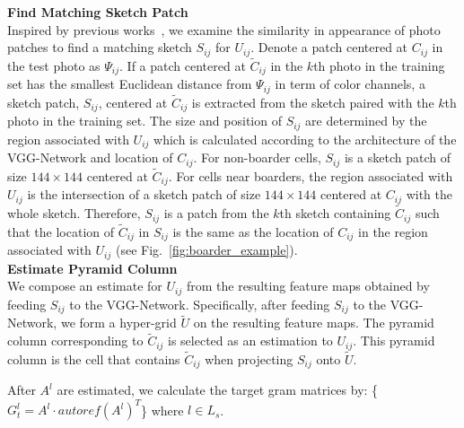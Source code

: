 \documentclass[10pt,twocolumn,letterpaper]{article}
\begin{document}

{\noindent \bf Find Matching Sketch Patch}\\
Inspired by previous works~\cite{wang2009face,zhou2012markov}, we examine the similarity in appearance of photo patches to find a matching sketch $S_{ij}$ for $U_{ij}$. Denote a patch centered at $C_{ij}$ in the test photo as $\Psi_{ij}$. If a patch centered at $\tilde{C}_{ij}$ in the $k$th photo in the training set has the smallest Euclidean distance from $\Psi_{ij}$ in term of color channels, a sketch patch, $S_{ij}$, centered at $\tilde{C}_{ij}$ is extracted from the sketch paired with the $k$th photo in the training set. The size and position of $S_{ij}$ are determined by the region associated with $U_{ij}$ which is calculated according to the architecture of the VGG-Network and location of $C_{ij}$. For non-boarder cells, $S_{ij}$ is a sketch patch of size $144\times144$ centered at $\tilde{C}_{ij}$. For cells near boarders, the region associated with $U_{ij}$ is the intersection of a sketch patch of size $144\times144$ centered at $C_{ij}$ with the whole sketch. Therefore, $S_{ij}$ is a patch from the $k$th sketch containing $\tilde{C}_{ij}$ such that the location of $\tilde{C}_{ij}$ in $S_{ij}$ is the same as the location of $C_{ij}$ in the region associated with $U_{ij}$ (see Fig.~\ref{fig:boarder_example}).\\
{\bf Estimate Pyramid Column}\\
We compose an estimate for $U_{ij}$ from the resulting feature maps obtained by feeding $S_{ij}$ to the VGG-Network. Specifically, after feeding $S_{ij}$ to the VGG-Network, we form a hyper-grid $\tilde{U}$ on the resulting feature maps. The pyramid column corresponding to $\tilde{C}_{ij}$ is selected as an estimation to $U_{ij}$. This pyramid column is the cell that contains $\tilde{C}_{ij}$ when projecting $S_{ij}$ onto $\tilde{U}$.\par
After $A^{l}$ are estimated, we calculate the target gram matrices by: \{$G_{t}^l =A^{l} \cdot {autoref( {{A^{l}}} )^T}$\} where $l\in L_s$.
\end{document}
